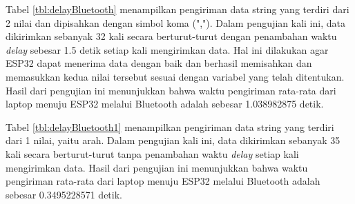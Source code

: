\newpage

Tabel \ref{tbl:delayBluetooth} menampilkan pengiriman data string yang terdiri dari 2 nilai dan dipisahkan dengan simbol koma (","). Dalam pengujian kali ini, data dikirimkan sebanyak 32 kali secara berturut-turut dengan penambahan waktu \emph{delay} sebesar 1.5 detik setiap kali mengirimkan data. Hal ini dilakukan agar ESP32 dapat menerima data dengan baik dan berhasil memisahkan dan memasukkan kedua nilai tersebut sesuai dengan variabel yang telah ditentukan. Hasil dari pengujian ini menunjukkan bahwa waktu pengiriman rata-rata dari laptop menuju ESP32 melalui Bluetooth adalah sebesar 1.038982875 detik.

Tabel \ref{tbl:delayBluetooth1} menampilkan pengiriman data string yang terdiri dari 1 nilai, yaitu arah. Dalam pengujian kali ini, data dikirimkan sebanyak 35 kali secara berturut-turut tanpa penambahan waktu \emph{delay} setiap kali mengirimkan data. Hasil dari pengujian ini menunjukkan bahwa waktu pengiriman rata-rata dari laptop menuju ESP32 melalui Bluetooth adalah sebesar 0.3495228571 detik.

